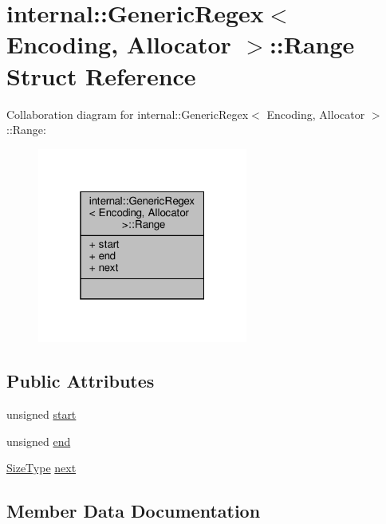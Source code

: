 \hypertarget{structinternal_1_1GenericRegex_1_1Range}{}\section{internal\+:\+:Generic\+Regex$<$ Encoding, Allocator $>$\+:\+:Range Struct Reference}
\label{structinternal_1_1GenericRegex_1_1Range}


Collaboration diagram for internal\+:\+:Generic\+Regex$<$ Encoding, Allocator $>$\+:\+:Range\+:
\nopagebreak
\begin{figure}[H]
\begin{center}
\leavevmode
\includegraphics[width=196pt]{structinternal_1_1GenericRegex_1_1Range__coll__graph}
\end{center}
\end{figure}
\subsection*{Public Attributes}
\begin{DoxyCompactItemize}
\item 
unsigned \hyperlink{structinternal_1_1GenericRegex_1_1Range_a7b407235cac7d4245b984c970c8b2026}{start}
\item 
unsigned \hyperlink{structinternal_1_1GenericRegex_1_1Range_a48a003fe4bf27591ec30595c968953f2}{end}
\item 
\hyperlink{rapidjson_8h_a5ed6e6e67250fadbd041127e6386dcb5}{Size\+Type} \hyperlink{structinternal_1_1GenericRegex_1_1Range_abaff4592e1947f5368339ebfa7ad9f7f}{next}
\end{DoxyCompactItemize}


\subsection{Member Data Documentation}
\mbox{\label{structinternal_1_1GenericRegex_1_1Range_a48a003fe4bf27591ec30595c968953f2}} 
